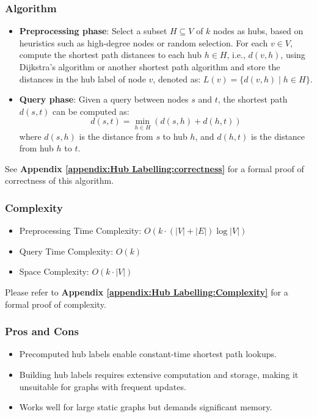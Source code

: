 			\subsubsection{Algorithm}
				\begin{itemize}
					\item \textbf{Preprocessing phase}: Select a subset \( H \subseteq V \) of \( k \) nodes as hubs, based on heuristics such as high-degree nodes or random selection. For each $v \in V$, compute the shortest path distances to each hub $h \in H$, i.e., $d(v, h)$, using Dijkstra’s algorithm or another shortest path algorithm and store the distances in the hub label of node $ v $, denoted as:
					$L(v) = \{ d(v, h) \mid h \in H \}$.
					\item \textbf{Query phase}: Given a query between nodes $ s $ and $ t $, the shortest path $ d(s, t) $ can be computed as:
					\begin{equation*}
						d(s,t) = \min_{h \in H} \left( d(s,h) + d(h,t) \right)
					\end{equation*}
					where $d(s, h)$ is the distance from $s$ to hub $h$, and $d(h, t)$ is the distance from hub $h$ to $t$.
				\end{itemize}
			See \textbf{Appendix \ref{appendix:Hub Labelling:correctness}} for a formal proof of correctness of this algorithm.
				\subsubsection{Complexity}
					\begin{itemize}
						\item Preprocessing Time Complexity:  $ O(k \cdot (|V| + |E|) \log |V|) $
						\item Query Time Complexity:  $ O(k) $
						\item Space Complexity:  $ O(k \cdot |V|) $
					\end{itemize} 
			Please refer to \textbf{Appendix \ref{appendix:Hub Labelling:Complexity}} for a formal proof of complexity. 
				
				\subsubsection{Pros and Cons}
				\begin{itemize}
					\item Precomputed hub labels enable constant-time shortest path lookups.
					\item Building hub labels requires extensive computation and storage, making it unsuitable for graphs with frequent updates.
					\item Works well for large static graphs but demands significant memory.
				\end{itemize}

